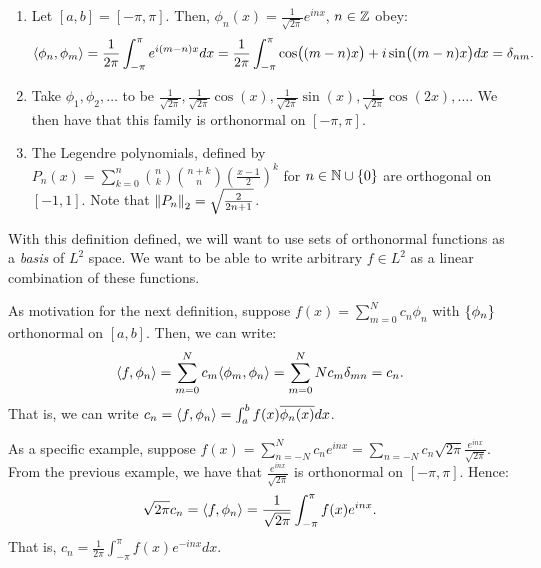 \begin{nexample}{}{}
    \begin{enumerate}
        \item Let $[a, b] = [-\pi, \pi]$. Then, $\phi_n(x) = \frac{1}{\sqrt{2\pi}}e^{inx}$, $n \in \mathbb{Z}$ obey:
        \begin{align*}
            \langle \phi_n, \phi_m \rangle = \frac{1}{2\pi}\int_{-\pi}^\pi e^{i(m-n)x}dx = \frac{1}{2\pi}\int_{-\pi}^\pi\cos((m-n)x) + i\sin((m-n)x)dx = \delta_{nm}.
        \end{align*}
        \item Take $\phi_1, \phi_2, \ldots$ to be $\frac{1}{\sqrt{2\pi}}, \frac{1}{\sqrt{2\pi}}\cos(x),  \frac{1}{\sqrt{2\pi}}\sin(x),  \frac{1}{\sqrt{2\pi}}\cos(2x), \ldots$. We then have that this family is orthonormal on $[-\pi, \pi]$. 
        \item The Legendre polynomials, defined by $P_n(x) = \sum_{k=0}^n \binom{n}{k}\binom{n+k}{n}\left(\frac{x - 1}{2}\right)^k$ for $n \in \mathbb{N} \cup \set{0}$ are orthogonal on $[-1, 1]$. Note that $\norm{P_n}_2 = \sqrt{\frac{2}{2n+1}}$. 
    \end{enumerate}
\end{nexample}
\noindent With this definition defined, we will want to use sets of orthonormal functions as a \emph{basis} of $L^2$ space. We want to be able to write arbitrary $f \in L^2$ as a linear combination of these functions.

\begin{nexample}{}{}
    As motivation for the next definition, suppose $f(x) = \sum_{m=0}^N c_n \phi_n$ with $\set{\phi_n}$ orthonormal on $[a, b]$. Then, we can write:
\begin{align*}
    \langle f, \phi_n \rangle = \sum_{m=0}^N c_m \langle \phi_m, \phi_n \rangle = \sum_{m=0}^NN c_m \delta_{mn} = c_n.
\end{align*}
That is, we can write $c_n = \langle f, \phi_n \rangle = \int_a^b f(x)\overline{\phi_n(x)}dx$.

As a specific example, suppose $f(x) = \sum_{n=-N}^N c_ne^{inx} = \sum_{n=-N}c_n\sqrt{2\pi}\frac{e^{inx}}{\sqrt{2\pi}}$. From the previous example, we have that $\frac{e^{inx}}{\sqrt{2\pi}}$ is orthonormal on $[-\pi, \pi]$. Hence:
\begin{align*}
    \sqrt{2\pi}c_n = \langle f, \phi_n \rangle = \frac{1}{\sqrt{2\pi}}\int_{-\pi}^\pi f(x)e^{inx}.
\end{align*}
That is, $c_n = \frac{1}{2\pi}\int_{-\pi}^\pi f(x)e^{-inx}dx$. 
\end{nexample}

